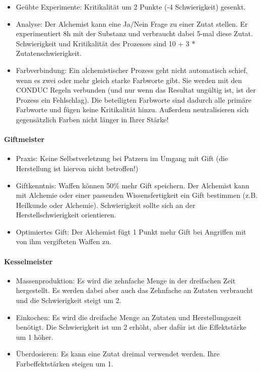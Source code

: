 \documentclass{article}
\begin{document}
\begin{itemize}
\item Geübte Experimente: Kritikalität um 2 Punkte (-4 Schwierigkeit) gesenkt.
\item Analyse: Der Alchemist kann eine Ja/Nein Frage zu einer Zutat stellen. Er experimentiert 8h mit der Substanz und verbraucht dabei 5-mal diese Zutat. Schwierigkeit und Kritikalität des Prozesses sind 10 + 3 * Zutatenschwierigkeit.
\item Farbverbindung: Ein alchemistischer Prozess geht nicht automatisch schief, wenn es zwei oder mehr gleich starke Farbworte gibt. Sie werden mit den CONDUC Regeln verbunden (und nur wenn das Resultat ungültig ist, ist der Prozess ein Fehlschlag). Die beteiligten Farbworte sind dadurch alle primäre Farbworte und fügen keine Kritikalität hinzu. Außerdem neutralisieren sich gegensätzlich Farben nicht länger in Ihrer Stärke!
\end{itemize}

\paragraph{Giftmeister}

\begin{itemize}
\item Praxis: Keine Selbstverletzung bei Patzern im Umgang mit Gift (die Herstellung ist hiervon nicht betroffen!)
\item Giftkenntnis: Waffen können 50\% mehr Gift speichern. Der Alchemist kann mit Alchemie oder einer passenden Wissensfertigkeit ein Gift bestimmen (z.B. Heilkunde oder Alchemie). Schwierigkeit sollte sich an der Herstellschwierigkeit orientieren.
\item Optimiertes Gift: Der Alchemist fügt 1 Punkt mehr Gift bei Angriffen mit von ihm vergifteten Waffen zu.
\end{itemize}

\paragraph{Kesselmeister}

\begin{itemize}
\item Massenproduktion: Es wird die zehnfache Menge in der dreifachen Zeit hergestellt. Es werden dabei aber auch das Zehnfache an Zutaten verbraucht und die Schwierigkeit steigt um 2.
\item Einkochen: Es wird die dreifache Menge an Zutaten und Herstellungszeit benötigt. Die Schwierigkeit ist um 2 erhöht, aber dafür ist die Effektstärke um 1 höher.
\item Überdosieren: Es kann eine Zutat dreimal verwendet werden. Ihre Farbeffektstärken steigen um 1.
\end{itemize}
\end{document}
